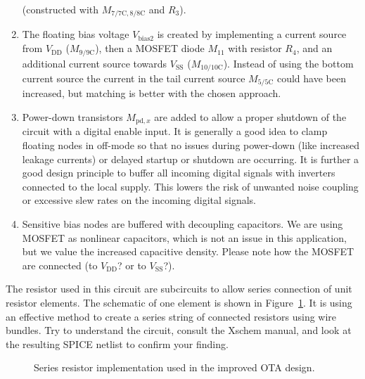 \documentclass[
  a4paper,
  DIV=11,
  numbers=noendperiod]{scrartcl}
\begin{document}
\begin{enumerate}
  (constructed with \(M_\mathrm{7/7C,8/8C}\) and \(R_3\)).
\item
  The floating bias voltage \(V_\mathrm{bias2}\) is created by
  implementing a current source from \(V_\mathrm{DD}\)
  (\(M_\mathrm{9/9C}\)), then a MOSFET diode \(M_{11}\) with resistor
  \(R_4\), and an additional current source towards \(V_\mathrm{SS}\)
  (\(M_\mathrm{10/10C}\)). Instead of using the bottom current source
  the current in the tail current source \(M_\mathrm{5/5C}\) could have
  been increased, but matching is better with the chosen approach.
\item
  Power-down transistors \(M_{\mathrm{pd,}x}\) are added to allow a
  proper shutdown of the circuit with a digital enable input. It is
  generally a good idea to clamp floating nodes in off-mode so that no
  issues during power-down (like increased leakage currents) or delayed
  startup or shutdown are occurring. It is further a good design
  principle to buffer all incoming digital signals with inverters
  connected to the local supply. This lowers the risk of unwanted noise
  coupling or excessive slew rates on the incoming digital signals.
\item
  Sensitive bias nodes are buffered with decoupling capacitors. We are
  using MOSFET as nonlinear capacitors, which is not an issue in this
  application, but we value the increased capacitive density. Please
  note how the MOSFET are connected (to \(V_\mathrm{DD}\)? or to
  \(V_\mathrm{SS}\)?).
\end{enumerate}

The resistor used in this circuit are subcircuits to allow series
connection of unit resistor elements. The schematic of one element is
shown in Figure~\ref{fig-improved-ota-design-res}. It is using an
effective method to create a series string of connected resistors using
wire bundles. Try to understand the circuit, consult the Xschem manual,
and look at the resulting SPICE netlist to confirm your finding.

\begin{figure}


\caption{\label{fig-improved-ota-design-res}Series resistor
implementation used in the improved OTA design.}

\end{figure}%
\end{document}
